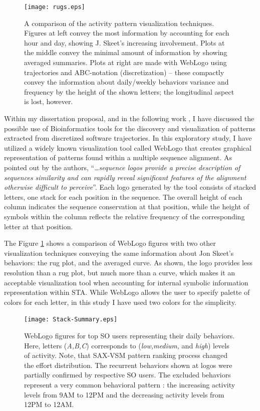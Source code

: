 \begin{figure}[t]
   \centering
   \texttt{[image: rugs.eps]}
   \caption{A comparison of the activity pattern visualization techniques. Figures at left convey the most information by accounting for each hour and day, showing J. Skeet's increasing involvement. Plots at the middle convey the minimal amount of information by showing averaged summaries. Plots at right are made with WebLogo \cite{weblogo} using trajectories and ABC-notation (discretization) -- these compactly convey the information about daily/weekly behaviors variance and frequency by the height of the shown letters; the longitudinal aspect is lost, however.}
   \label{fig:rugs}   
\end{figure}

Within my dissertation proposal, and in the following work \cite{csdl2-10-09}, I have discussed the possible use of Bioinformatics tools for the discovery and visualization of patterns extracted from discretized software trajectories. In this exploratory study, I have utilized a widely known visualization tool called WebLogo \cite{weblogo} that creates graphical representation of patterns found within a multiple sequence alignment. As pointed out by the authors, ``\dots \textit{sequence logos provide a precise description of sequences similarity and can rapidly reveal significant features of the alignment otherwise difficult to perceive}''. Each logo generated by the tool consists of stacked letters, one stack for each position in the sequence. The overall height of each column indicates the sequence conservation at that position, while the height of symbols within the column reflects the relative frequency of the corresponding letter at that position.

The Figure \ref{fig:rugs} shows a comparison of WebLogo figures with two other visualization techniques conveying the same information about Jon Skeet's behaviors: the rug plot, and the averaged curve. As shown, the logo provides less resolution than a rug plot, but much more than a curve, which makes it an acceptable visualization tool when accounting for internal symbolic information representation within STA. While WebLogo allows the user to specify palette of colors for each letter, in this study I have used two colors for the simplicity. 

\begin{figure}[t]
   \centering
   \texttt{[image: Stack-Summary.eps]}
   \caption{WebLogo figures for top SO users representing their daily behaviors. Here, letters (\textit{A,B,C}) corresponds to (\textit{low,medium,} and \textit{high}) levels of activity. Note, that SAX-VSM pattern ranking process changed the effort distribution. 
   The recurrent behaviors shown at logos were partially confirmed by respective SO users. 
   The excluded behaviors represent a very common behavioral pattern \cite{activity_patterns}: 
   the increasing activity levels from 9AM to 12PM and the decreasing activity levels from 12PM to 12AM.}
   \label{fig:stack_daily}   
\end{figure}


